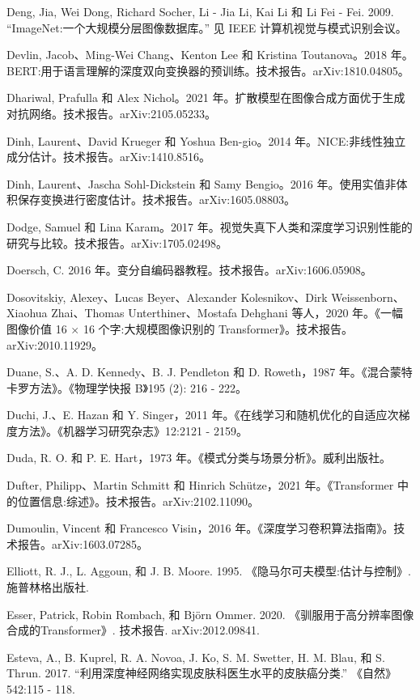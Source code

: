 \documentclass[10pt]{report}
\begin{document}
Deng, Jia, Wei Dong, Richard Socher, Li - Jia Li, Kai Li 和 Li Fei - Fei. 2009. “ImageNet:一个大规模分层图像数据库。” 见 IEEE 计算机视觉与模式识别会议。

Devlin, Jacob、Ming-Wei Chang、Kenton Lee 和 Kristina Toutanova。2018 年。BERT:用于语言理解的深度双向变换器的预训练。技术报告。arXiv:1810.04805。

Dhariwal, Prafulla 和 Alex Nichol。2021 年。扩散模型在图像合成方面优于生成对抗网络。技术报告。arXiv:2105.05233。

Dinh, Laurent、David Krueger 和 Yoshua Ben-gio。2014 年。NICE:非线性独立成分估计。技术报告。arXiv:1410.8516。

Dinh, Laurent、Jascha Sohl-Dickstein 和 Samy Bengio。2016 年。使用实值非体积保存变换进行密度估计。技术报告。arXiv:1605.08803。

Dodge, Samuel 和 Lina Karam。2017 年。视觉失真下人类和深度学习识别性能的研究与比较。技术报告。arXiv:1705.02498。

Doersch, C. 2016 年。变分自编码器教程。技术报告。arXiv:1606.05908。

Dosovitskiy, Alexey、Lucas Beyer、Alexander Kolesnikov、Dirk Weissenborn、Xiaohua Zhai、Thomas Unterthiner、Mostafa Dehghani 等人，2020 年。《一幅图像价值 16 \(\times\) 16 个字:大规模图像识别的 Transformer》。技术报告。arXiv:2010.11929。

Duane, S.、A. D. Kennedy、B. J. Pendleton 和 D. Roweth，1987 年。《混合蒙特卡罗方法》。《物理学快报 B》195 (2): 216 - 222。

Duchi, J.、E. Hazan 和 Y. Singer，2011 年。《在线学习和随机优化的自适应次梯度方法》。《机器学习研究杂志》12:2121 - 2159。

Duda, R. O. 和 P. E. Hart，1973 年。《模式分类与场景分析》。威利出版社。

Dufter, Philipp、Martin Schmitt 和 Hinrich Schütze，2021 年。《Transformer 中的位置信息:综述》。技术报告。arXiv:2102.11090。

Dumoulin, Vincent 和 Francesco Visin，2016 年。《深度学习卷积算法指南》。技术报告。arXiv:1603.07285。

Elliott, R. J., L. Aggoun, 和 J. B. Moore. 1995. 《隐马尔可夫模型:估计与控制》. 施普林格出版社.

Esser, Patrick, Robin Rombach, 和 Björn Ommer. 2020. 《驯服用于高分辨率图像合成的Transformer》. 技术报告. arXiv:2012.09841.

Esteva, A., B. Kuprel, R. A. Novoa, J. Ko, S. M. Swetter, H. M. Blau, 和 S. Thrun. 2017. “利用深度神经网络实现皮肤科医生水平的皮肤癌分类.” 《自然》542:115 - 118.
\end{document}
